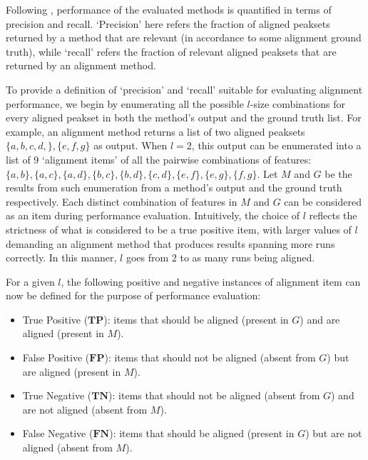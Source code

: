 Following \cite{Wandy2015}, performance of the evaluated methods is quantified in terms of precision and recall. `Precision' here refers the fraction of aligned peaksets returned by a method that are relevant (in accordance to some alignment ground truth), while `recall' refers the fraction of relevant aligned peaksets that are returned by an alignment method.

To provide a definition of `precision' and `recall' suitable for evaluating alignment performance, we begin by enumerating all the possible $l$-size combinations for every aligned peakset in both the method's output and the ground truth list. For example, an alignment method returns a list of two aligned peaksets $\{a,b,c,d,\},\allowbreak\{e,f,g\}$ as output. When $l=2$, this output can be enumerated into a list of 9 `alignment items' of all the pairwise combinations of features: $\{a,b\},\allowbreak\{a,c\},\allowbreak\{a,d\},\allowbreak\{b,c\},\allowbreak\{b,d\},\allowbreak\{c,d\},\allowbreak\{e,f\},\allowbreak\{e,g\},\allowbreak\{f,g\}$. Let $M$ and $G$ be the results from such enumeration from a method's output and the ground truth respectively. Each distinct combination of features in $M$ and $G$ can be considered as an item during performance evaluation. Intuitively, the choice of $l$ reflects the strictness of what is considered to be a true positive item, with larger values of $l$ demanding an alignment method that produces results spanning more runs correctly. In this manner, $l$ goes from 2 to as many runs being aligned.

For a given $l$, the following positive and negative instances of alignment item can now be defined for the purpose of performance evaluation:
\begin{itemize}
\item True Positive ($\boldsymbol{TP}$): items that should be aligned (present in $G$) and are aligned (present in $M$).
\item False Positive ($\boldsymbol{FP}$): items that should not be aligned (absent from $G$) but are aligned (present in $M$).
\item True Negative ($\boldsymbol{TN}$): items that should not be aligned (absent from $G$) and are not aligned (absent from $M$).
\item False Negative ($\boldsymbol{FN}$): items that should be aligned (present in $G$) but are not aligned (absent from $M$).
\end{itemize}

